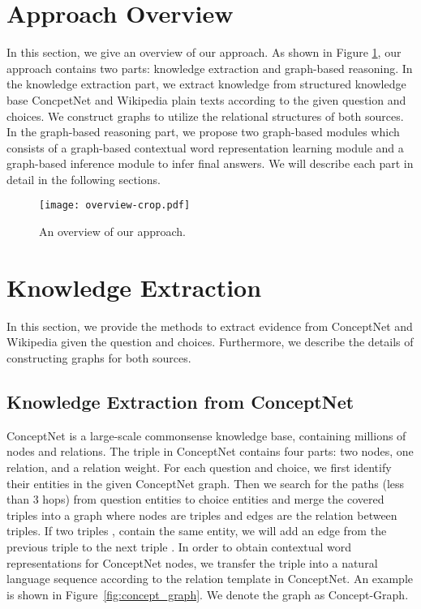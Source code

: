 \documentclass[letterpaper]{article} \usepackage{aaai20}  \usepackage{times}  \usepackage{helvet} \usepackage{courier}  \usepackage[hyphens]{url}  \usepackage{graphicx} \urlstyle{rm} \def\UrlFont{\rm}  \usepackage{graphicx}  \frenchspacing  \setlength{\pdfpagewidth}{8.5in}  \setlength{\pdfpageheight}{11in}
\begin{document}
\section{Approach Overview}
In this section, we give an overview of our approach. As shown in Figure \ref{fig:overview}, our approach contains two parts: knowledge extraction and graph-based reasoning. In the knowledge extraction part, we extract knowledge from structured knowledge base ConcpetNet  and Wikipedia plain texts according to the given question and choices. We construct graphs to utilize the relational structures of both sources. 
In the graph-based reasoning part, we propose two graph-based modules which consists of a graph-based contextual word representation learning module and a graph-based inference module to infer final answers. We will describe each part in detail in the following sections.

\begin{figure}[H]
	\centering
	\texttt{[image: overview-crop.pdf]}
	\caption{An overview of our approach.}
	\label{fig:overview}
\end{figure}


 \section{Knowledge Extraction}

In this section, we provide the methods to extract evidence from ConceptNet and Wikipedia given the question and choices. Furthermore, we describe the details of constructing graphs for both sources.

\subsection{Knowledge Extraction from ConceptNet}
ConceptNet is a large-scale commonsense knowledge base, containing millions of nodes and relations.  The triple in ConceptNet contains four parts: two nodes, one relation, and a relation weight. 
For each question and choice, we first identify their entities in the given ConceptNet graph. Then we search for the paths (less than 3  hops) from question entities to choice entities and merge the covered triples into a graph where nodes are triples and edges are the relation between triples.  If two triples ,  contain the same entity, we will add an edge from the previous triple  to the next triple . In order to obtain contextual word representations for ConceptNet nodes, we transfer the triple into a natural language sequence according to the relation template in ConceptNet. 
An example is shown in Figure~\ref{fig:concept_graph}.  We denote the graph as Concept-Graph.
\end{document}
